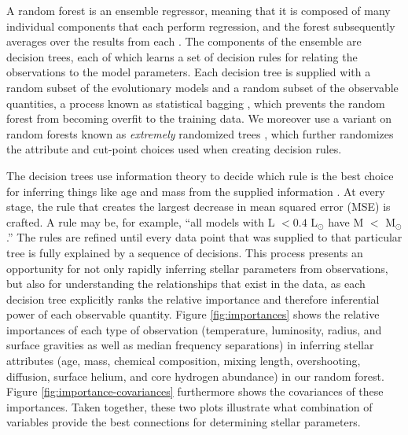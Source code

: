 \documentclass[manuscript]{aastex}
\begin{document}
A random forest is an ensemble regressor, meaning that it is composed of many individual components that each perform regression, and the forest subsequently averages over the results from each \citep{breiman2001random}. The components of the ensemble are decision trees, each of which learns a set of decision rules for relating the observations to the model parameters. Each decision tree is supplied with a random subset of the evolutionary models and a random subset of the observable quantities, a process known as statistical bagging \citep[see section 8.7 of][]{hastie2005elements}, which prevents the random forest from becoming overfit to the training data. We moreover use a variant on random forests known as \emph{extremely} randomized trees \citep{geurts2006extremely}, which further randomizes the attribute and cut-point choices used when creating decision rules. %

The decision trees use information theory to decide which rule is the best choice for inferring things like age and mass from the supplied information \citep[see chapter 9 of][]{hastie2005elements}. At every stage, the rule that creates the largest decrease in mean squared error (MSE) is crafted. A rule may be, for example, ``all models with L $<0.4$ L$_\odot$ have M $<$ M$_\odot$.'' %
The rules are refined until every data point that was supplied to that particular tree is fully explained by a sequence of decisions. This process presents an opportunity for not only rapidly inferring stellar parameters from observations, but also for understanding the relationships that exist in the data, as each decision tree explicitly ranks the relative importance and therefore inferential power of each observable quantity. Figure \ref{fig:importances} shows the relative importances of each type of observation (temperature, luminosity, radius, and surface gravities as well as median frequency separations) in inferring stellar attributes (age, mass, chemical composition, mixing length, overshooting, diffusion, surface helium, and core hydrogen abundance) in our random forest. Figure \ref{fig:importance-covariances} furthermore shows the covariances of these importances. Taken together, these two plots illustrate what combination of variables provide the best connections for determining stellar parameters.
\end{document}
